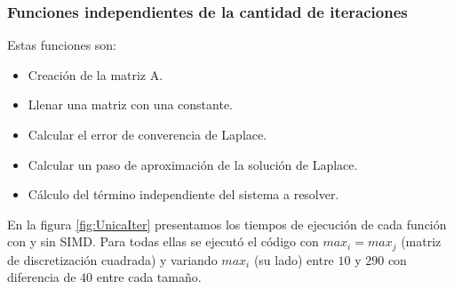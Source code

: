 \documentclass[a4paper]{article}
\begin{document}
\subsubsection{Funciones independientes de la cantidad de iteraciones}

Estas funciones son:
\begin{itemize}
\item Creación de la matriz A.
\item Llenar una matriz con una constante.
\item Calcular el error de converencia de Laplace.
\item Calcular un paso de aproximación de la solución de Laplace.
\item Cálculo del término independiente del sistema a resolver.
\end{itemize}

En la figura \ref{fig:UnicaIter} presentamos los tiempos de ejecución 
de cada función con y sin SIMD. Para todas ellas se ejecutó el código 
con $max_i = max_j$ (matriz de discretización cuadrada) y variando 
$max_i$ (su lado) entre $10$ y $290$ con diferencia de $40$ entre cada tamaño.\\
\end{document}
